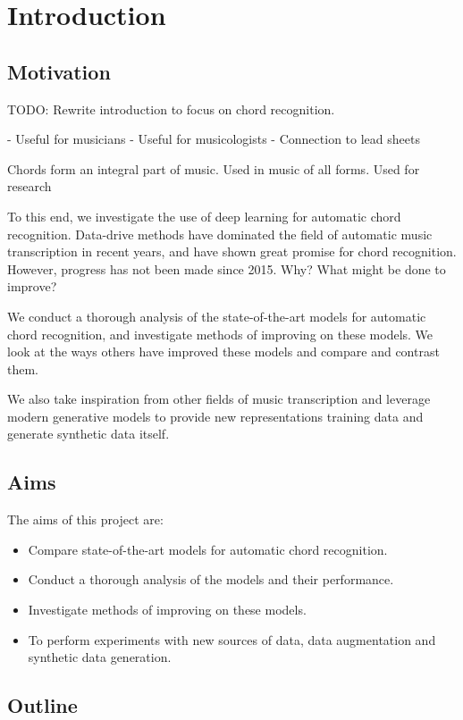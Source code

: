 \chapter{Introduction}

\section{Motivation}

TODO:
Rewrite introduction to focus on chord recognition.

- Useful for musicians
- Useful for musicologists
- Connection to lead sheets

Chords form an integral part of music. Used in music of all forms. Used for research

To this end, we investigate the use of deep learning for automatic chord recognition. Data-drive methods have dominated the field of automatic music transcription in recent years, and have shown great promise for chord recognition. However, progress has not been made since 2015. Why? What might be done to improve?

We conduct a thorough analysis of the state-of-the-art models for automatic chord recognition, and investigate methods of improving on these models. We look at the ways others have improved these models and compare and contrast them. 

We also take inspiration from other fields of music transcription and leverage modern generative models to provide new representations training data and generate synthetic data itself.


\section{Aims}

The aims of this project are:
\begin{itemize}
    \item Compare state-of-the-art models for automatic chord recognition.
    \item Conduct a thorough analysis of the models and their performance.
    \item Investigate methods of improving on these models.
    \item To perform experiments with new sources of data, data augmentation and synthetic data generation.
\end{itemize}

\section{Outline}

